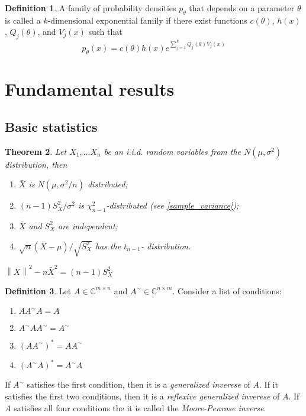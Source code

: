 \documentclass[12pt]{article}
\newtheorem{theorem}{Theorem}[section]
\theoremstyle{definition}
\newtheorem{definition}[theorem]{Definition}
\theoremstyle{remark}
\numberwithin{equation}{section}
\newcommand{\CC}{\mathbb{C}}
\begin{document}
\begin{definition}\label{exponential_family}
	A family of probability densities $p_\theta$ that depends on a parameter $\theta$ is called a $k$-dimensional exponential family if there exist functions $c(\theta)$, $h(x)$, $Q_j(\theta)$, and $V_j(x)$ such that
	\begin{equation*}
		p_\theta(x) = c(\theta)h(x)e^{\sum_{j=1}^k Q_j(\theta)V_j(x)}
	\end{equation*}
\end{definition}

\section{Fundamental results}


\subsection{Basic statistics}

\begin{theorem}\label{normaliid}
	Let $X_1,\ldots X_n$ be an i.i.d. random variables from the $N(\mu, \sigma^2)$ distribution, then
	\begin{enumerate}
		\item $\bar X$ is $N(\mu, \sigma^2/n)$ distributed;
		\item $(n-1)S_X^2/\sigma^2$ is $\chi^2_{n-1}$-distributed (see \ref{sample_variance});
		\item $\bar X$ and $S^2_{X}$ are independent;
		\item $\sqrt{n}(\bar{X} - \mu)/\sqrt{S_X^2}$ has the $t_{n-1}$- distribution.
	\end{enumerate}
\end{theorem}
\proof $\left\|X\right\|^2 - n \bar{X}^2 = (n-1)S_X^2$

\begin{definition}
	Let $A\in\CC^{m\times n}$ and $A^{\sim}\in \CC^{n\times m}$. Consider a list of conditions:
	\begin{enumerate}
		\item $AA^{\sim}A = A$
		\item $A^{\sim}AA^{\sim} = A^{\sim}$
		\item $(AA^{\sim})^* = AA^{\sim}$
		\item $(A^{\sim}A)^* = A^{\sim}A$
	\end{enumerate}
	If $A^{\sim}$ satisfies the first condition, then it is a \emph{generalized inverese} of $A$. If it satisfies the first two conditions, then it is a \emph{reflexive generalized inverese} of $A$. If $A$ satisfies all four conditions the it is called the \emph{Moore-Penrose inverse}.
\end{definition}
\end{document}
